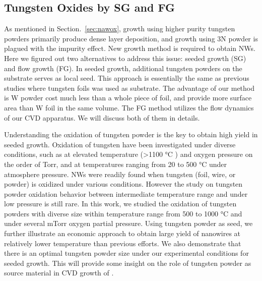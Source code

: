 \subsection{Tungsten Oxides by SG and FG}\label{sec:sgfg}

As mentioned in Section.~\ref{sec:nawox}, growth using higher purity tungsten powders primarily produce dense layer deposition, and growth using 3N powder is plagued with the impurity effect. New growth method is required to obtain  NWs. Here we figured out two alternatives to address this issue: seeded growth (SG) and flow growth (FG). In seeded growth, additional tungsten powders on the substrate serves as local seed. This approach is essentially the same as previous studies where tungsten foils was used as substrate. The advantage of our method is W powder cost much less than a whole piece of foil, and provide more surface area than W foil in the same volume. The FG method utilizes the flow dynamics of our CVD apparatus. We will discuss both of them in details.

Understanding the oxidation of tungsten powder is the key to obtain high yield in seeded growth. Oxidation of tungsten have been investigated under diverse conditions, such as at elevated temperature (\textgreater 1100 \si{\degreeCelsius} ) and oxygen pressure on the order of Torr,\cite{Base1965} and at temperatures ranging from 20 to 500 \si{\degreeCelsius} under atmosphere pressure.\cite{Warren1996}  NWs were readily found when tungsten (foil, wire, or powder) is oxidized under various conditions.\cite{Zhu1999,Karuppanan2007,Hsieh2010} However the study on tungsten powder oxidation behavior between intermediate temperature range and under low pressure is still rare. In this work, we studied the oxidation of tungsten powders with diverse size within temperature range from 500 to 1000 \si{\degreeCelsius} and under several mTorr oxygen partial pressure. Using tungsten powder as seed, we further illustrate an economic approach to obtain large yield of  nanowires at relatively lower temperature than previous efforts. We also demonstrate that there is an optimal tungsten powder size under our experimental conditions for seeded growth. This will provide some insight on the role of tungsten powder as source material in CVD growth of .

